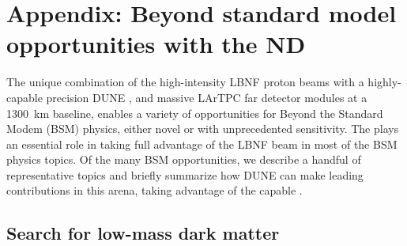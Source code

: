 \section{Appendix:  Beyond standard model opportunities with the ND}
\label{sec:exsum-nd-BSMappendix}

The unique combination of the high-intensity LBNF proton beams with a highly-capable precision DUNE , and massive LArTPC far detector modules at a 1300~km baseline, enables a variety of opportunities for Beyond the Standard Modem (BSM) physics, either novel or with unprecedented sensitivity. The  plays an essential role in taking full advantage of the LBNF beam in most of the BSM physics topics.  Of the many BSM opportunities, we describe a handful of representative topics and briefly summarize how DUNE can make leading contributions in this arena, taking advantage of the capable . 

\subsection{Search for low-mass dark matter}
\label{ssec:exsum-nd-BSMappendix-dm}


